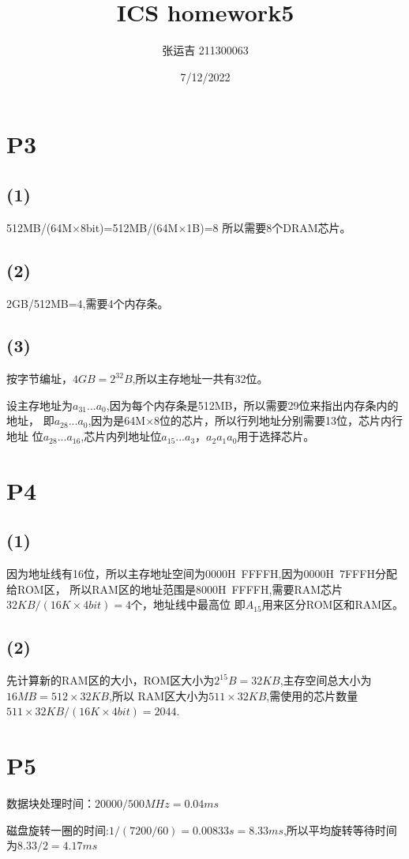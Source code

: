\documentclass{article}
\title{ICS homework5}
\author{张运吉 211300063}
\date{7/12/2022}
\begin{document}
 
\maketitle %

\section{P3}
\subsection*{(1)}
512MB/(64M$\times$8bit)=512MB/(64M$\times$1B)=8
所以需要8个DRAM芯片。
\subsection*{(2)}
2GB/512MB=4,需要4个内存条。
\subsection*{(3)}
按字节编址，$4GB=2^{32}B$,所以主存地址一共有32位。

设主存地址为$a_{31}...a_{0}$,因为每个内存条是512MB，所以需要29位来指出内存条内的地址，
即$a_{28}...a_{0}$,因为是64M$\times$8位的芯片，所以行列地址分别需要13位，芯片内行地址
位$a_{28}...a_{16}$,芯片内列地址位$a_{15}...a_{3}$，$a_{2}a_{1}a_{0}$用于选择芯片。
\section{P4}
\subsection*{(1)}
因为地址线有16位，所以主存地址空间为0000H~FFFFH,因为0000H~7FFFH分配给ROM区，
所以RAM区的地址范围是8000H~FFFFH,需要RAM芯片$32KB/(16K\times4bit)=4$个，地址线中最高位
即$A_{15}$用来区分ROM区和RAM区。
\subsection*{(2)}
先计算新的RAM区的大小，ROM区大小为$2^{15}B=32KB$,主存空间总大小为$16MB=512\times 32KB$,所以
RAM区大小为$511\times 32KB$,需使用的芯片数量$511\times32KB/(16K\times4bit)=2044$.
\section{P5}
数据块处理时间：$20000/500MHz=0.04ms$

磁盘旋转一圈的时间:$1/(7200/60)=0.00833s=8.33ms$,所以平均旋转等待时间为$8.33/2=4.17ms$
\end{document}
